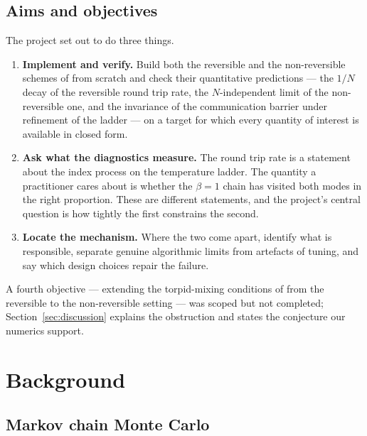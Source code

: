\subsection{Aims and objectives}

The project set out to do three things.

\begin{enumerate}
  \item \textbf{Implement and verify.} Build both the reversible and the
  non-reversible schemes of \citet{syed2022} from scratch and check their
  quantitative predictions --- the $1/N$ decay of the reversible round trip rate,
  the $N$-independent limit of the non-reversible one, and the invariance of the
  communication barrier under refinement of the ladder --- on a target for which
  every quantity of interest is available in closed form.

  \item \textbf{Ask what the diagnostics measure.} The round trip rate is a
  statement about the index process on the temperature ladder. The quantity a
  practitioner cares about is whether the $\beta=1$ chain has visited both modes
  in the right proportion. These are different statements, and the project's
  central question is how tightly the first constrains the second.

  \item \textbf{Locate the mechanism.} Where the two come apart, identify what is
  responsible, separate genuine algorithmic limits from artefacts of tuning, and
  say which design choices repair the failure.
\end{enumerate}

A fourth objective --- extending the torpid-mixing conditions of
\citet{woodard2009torpid} from the reversible to the non-reversible setting ---
was scoped but not completed; Section~\ref{sec:discussion} explains the
obstruction and states the conjecture our numerics support.


\section{Background}

\subsection{Markov chain Monte Carlo}


